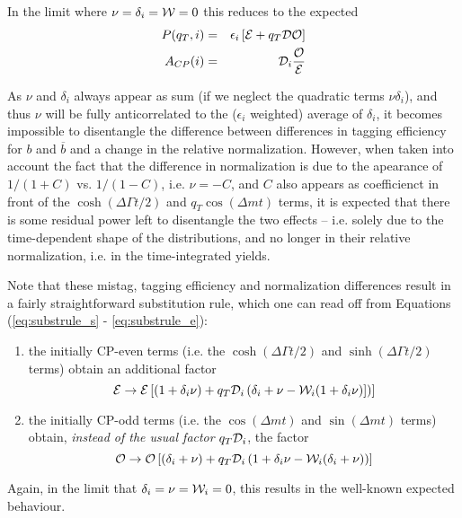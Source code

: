 \documentclass[a4paper,9pt,twoside]{article}
\begin{document}
In the limit where $\nu=\delta_i={\cal W}=0$ this reduces to the expected
\begin{eqnarray}
   P(q_T,i) &=& \epsilon_i\left[  {\cal E} +q_T {\cal D} {\cal O}\right]  \\
   A_{CP}(i) &=&  {\cal D}_i\frac{\cal O }{\cal E}
\end{eqnarray}

As $\nu$ and $\delta_i$ always appear as sum (if we neglect the quadratic terms $\nu\delta_i$), and thus $\nu$ will be fully anticorrelated to the ($\epsilon_i$ weighted) average of $\delta_i$,
it becomes impossible to disentangle the difference between differences in tagging efficiency for $b$ and $\overline{b}$
and a change in the relative normalization. However, when taken into account the fact that the difference in normalization
is due to the apearance of $1/(1+C)$ vs. $1/(1-C)$, i.e. $\nu = -C$, and $C$ also appears as coefficienct in front of the $\cosh\left(\Delta\Gamma t/2\right)$
and $q_T\cos(\Delta m t)$ terms, it is expected that there is some residual power left to disentangle the two effects -- i.e. 
solely due to the time-dependent shape of the distributions, and no longer in their relative normalization, i.e. in the time-integrated yields.


Note that these mistag, tagging efficiency and normalization differences result in a fairly 
straightforward substitution rule, which one can read off from Equations (\ref{eq:substrule_s} - \ref{eq:substrule_e}):
\begin{enumerate}
\item
the initially CP-even terms (i.e. the $\cosh(\Delta\Gamma t/2)$ and $\sinh(\Delta\Gamma t/2)$ terms) obtain an additional
factor 
\begin{equation}
   {\cal E} \rightarrow {\cal E} \left[ (1+\delta_i\nu)+ q_T {\cal D}_i \left( \delta_i + \nu -{\cal W}_i(1+\delta_i\nu) ]\right) \right]
\end{equation}
\item
the initially CP-odd terms (i.e. the $\cos(\Delta m t) $ and $\sin(\Delta m t)$ terms) obtain, { \em instead of the
usual factor} $q_T{\cal D}_i$, the factor
\begin{equation}
   {\cal O} \rightarrow {\cal O} \left[ (\delta_i+\nu) +  q_T {\cal D}_i  \left( 1+\delta_i\nu - {\cal W}_i(\delta_i+\nu) \right) \right]
\end{equation}
\end{enumerate}
Again, in the limit that $\delta_i=\nu={\cal W}_i=0$, this results in the well-known expected behaviour.
\end{document}
